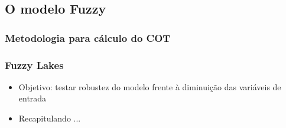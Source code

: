 \documentclass[aspectratio=169]{beamer} %
\begin{document}
{\subsection{O modelo Fuzzy}

{
\begin{frame}
\frametitle{Metodologia para cálculo do COT}
\begin{center}
\end{center}
\end{frame} 
}


{
\begin{frame}
	\frametitle{Fuzzy Lakes}

\pause
	\begin{itemize}
		\item Objetivo: testar robustez do modelo frente à diminuição das variáveis de entrada
		\pause
		\item Recapitulando ... 
	\end{itemize}


\end{frame}}}
\end{document}
